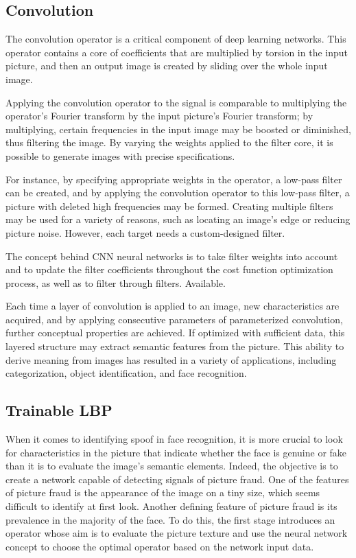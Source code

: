 \documentclass[journal]{IEEEtran}
\begin{document}
\subsection{Convolution}
The convolution operator is a critical component of deep learning networks. This operator contains a core of coefficients that are multiplied by torsion in the input picture, and then an output image is created by sliding over the whole input image.

Applying the convolution operator to the signal is comparable to multiplying the operator's Fourier transform by the input picture's Fourier transform; by multiplying, certain frequencies in the input image may be boosted or diminished, thus filtering the image. By varying the weights applied to the filter core, it is possible to generate images with precise specifications.

For instance, by specifying appropriate weights in the operator, a low-pass filter can be created, and by applying the convolution operator to this low-pass filter, a picture with deleted high frequencies may be formed. Creating multiple filters may be used for a variety of reasons, such as locating an image's edge or reducing picture noise. However, each target needs a custom-designed filter.

The concept behind CNN neural networks is to take filter weights into account and to update the filter coefficients throughout the cost function optimization process, as well as to filter through filters. Available.

Each time a layer of convolution is applied to an image, new characteristics are acquired, and by applying consecutive parameters of parameterized convolution, further conceptual properties are achieved. If optimized with sufficient data, this layered structure may extract semantic features from the picture. This ability to derive meaning from images has resulted in a variety of applications, including categorization, object identification, and face recognition.

\subsection{Trainable LBP}
When it comes to identifying spoof in face recognition, it is more crucial to look for characteristics in the picture that indicate whether the face is genuine or fake than it is to evaluate the image's semantic elements. Indeed, the objective is to create a network capable of detecting signals of picture fraud. One of the features of picture fraud is the appearance of the image on a tiny size, which seems difficult to identify at first look. Another defining feature of picture fraud is its prevalence in the majority of the face. To do this, the first stage introduces an operator whose aim is to evaluate the picture texture and use the neural network concept to choose the optimal operator based on the network input data.
\end{document}
